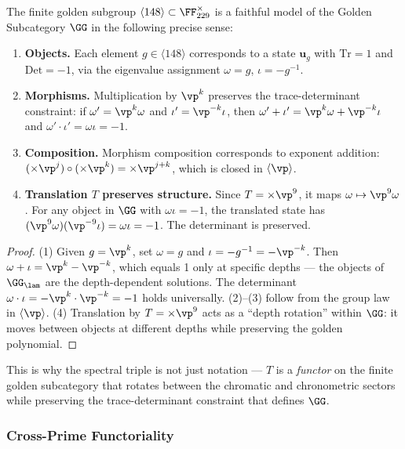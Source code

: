 \begin{proposition}\label{prop:faithful}
The finite golden subgroup $\langle 148 \rangle \subset \FF_{229}^\times$ is a faithful model of the Golden Subcategory $\GG$ in the following precise sense:
\begin{enumerate}
\item \textbf{Objects.} Each element $g \in \langle 148 \rangle$ corresponds to a state $\mathbf{u}_g$ with $\mathrm{Tr} = 1$ and $\mathrm{Det} = -1$, via the eigenvalue assignment $\omega = g$, $\iota = -g^{-1}$.
\item \textbf{Morphisms.} Multiplication by $\vp^k$ preserves the trace-determinant constraint: if $\omega' = \vp^k \omega$ and $\iota' = \vp^{-k}\iota$, then $\omega' + \iota' = \vp^k\omega + \vp^{-k}\iota$ and $\omega' \cdot \iota' = \omega\iota = -1$.
\item \textbf{Composition.} Morphism composition corresponds to exponent addition: $(\times\vp^j) \circ (\times\vp^k) = \times\vp^{j+k}$, which is closed in $\langle\vp\rangle$.
\item \textbf{Translation $T$ preserves structure.} Since $T = \times\vp^9$, it maps $\omega \mapsto \vp^9\omega$. For any object in $\GG$ with $\omega\iota = -1$, the translated state has $(\vp^9\omega)(\vp^{-9}\iota) = \omega\iota = -1$. The determinant is preserved.
\end{enumerate}
\end{proposition}
\begin{proof}
(1) Given $g = \vp^k$, set $\omega = g$ and $\iota = -g^{-1} = -\vp^{-k}$. Then $\omega + \iota = \vp^k - \vp^{-k}$, which equals 1 only at specific depths --- the objects of $\GG_\lam$ are the depth-dependent solutions. The determinant $\omega \cdot \iota = -\vp^k \cdot \vp^{-k} = -1$ holds universally. (2)--(3) follow from the group law in $\langle\vp\rangle$. (4) Translation by $T = \times\vp^9$ acts as a ``depth rotation'' within $\GG$: it moves between objects at different depths while preserving the golden polynomial. \qedhere
\end{proof}

This is why the spectral triple is not just notation --- $T$ is a \emph{functor} on the finite golden subcategory that rotates between the chromatic and chronometric sectors while preserving the trace-determinant constraint that defines $\GG$.

\subsubsection*{Cross-Prime Functoriality}

